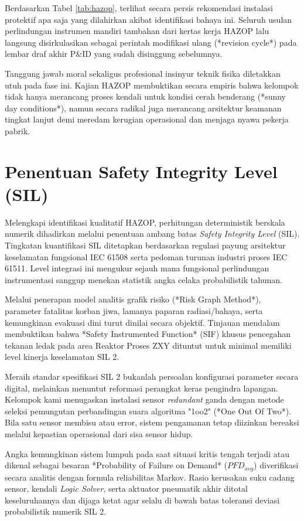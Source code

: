 \documentclass[12pt, a4paper]{report}
\begin{document}
Berdasarkan Tabel \ref{tab:hazop}, terlihat secara persis rekomendasi instalasi protektif apa saja yang dilahirkan akibat identifikasi bahaya ini. Seluruh usulan perlindungan instrumen mandiri tambahan dari kertas kerja HAZOP lalu langsung disirkulasikan sebagai perintah modifikasi ulang (*revision cycle*) pada lembar draf akhir P\&ID yang sudah disinggung sebelumnya. 

Tanggung jawab moral sekaligus profesional insinyur teknik fisika diletakkan utuh pada fase ini. Kajian HAZOP membuktikan secara empiris bahwa kelompok tidak hanya merancang proses kendali untuk kondisi cerah benderang (*sunny day conditions*), namun secara radikal juga merancang arsitektur keamanan tingkat lanjut demi meredam kerugian operasional dan menjaga nyawa pekerja pabrik.

\section{Penentuan Safety Integrity Level (SIL)}
Melengkapi identifikasi kualitatif HAZOP, perhitungan deterministik berskala numerik dihadirkan melalui penentuan ambang batas \textit{Safety Integrity Level} (SIL). Tingkatan kuantifikasi SIL ditetapkan berdasarkan regulasi payung arsitektur keselamatan fungsional IEC 61508 serta pedoman turunan industri proses IEC 61511. Level integrasi ini mengukur sejauh mana fungsional perlindungan instrumentasi sanggup menekan statistik angka celaka probabilistik tahunan.

Melalui penerapan model analitis grafik risiko (*Risk Graph Method*), parameter fatalitas korban jiwa, lamanya paparan radiasi/bahaya, serta kemungkinan evakuasi dini turut dinilai secara objektif. Tinjauan mendalam membuktikan bahwa *Safety Instrumented Function* (SIF) khusus pencegahan tekanan ledak pada area Reaktor Proses ZXY dituntut untuk minimal memiliki level kinerja keselamatan SIL 2.

Meraih standar spesifikasi SIL 2 bukanlah persoalan konfigurasi parameter secara digital, melainkan menuntut reformasi perangkat keras pengindra lapangan. Kelompok kami menugaskan instalasi sensor \textit{redundant} ganda dengan metode seleksi pemungutan perbandingan suara algoritma "1oo2" (*One Out Of Two*). Bila satu sensor membisu atau error, sistem pengamanan tetap diizinkan bereaksi melalui kepastian operasional dari sisa sensor hidup.

Angka kemungkinan sistem lumpuh pada saat situasi kritis tengah terjadi atau dikenal sebagai besaran *Probability of Failure on Demand* ($PFD_{avg}$) diverifikasi secara analitis dengan formula reliabilitas Markov. Rasio kerusakan suku cadang sensor, kendali \textit{Logic Solver}, serta aktuator pneumatik akhir ditotal keseluruhannya dan dijaga ketat agar selalu di bawah batas toleransi deviasi probabilistik numerik SIL 2.
\end{document}
